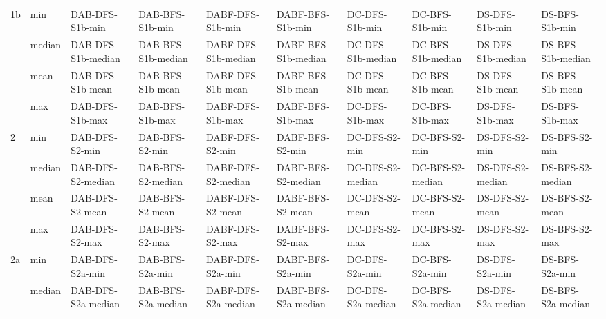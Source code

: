 \begin{table}
\begin{tabular}{|l|l|l|l|l|l|l|l|l|l|}
\hline
\multirow{4}{*}{1b} & min    & DAB-DFS-S1b-min    & DAB-BFS-S1b-min    & DABF-DFS-S1b-min    & DABF-BFS-S1b-min    & DC-DFS-S1b-min           & DC-BFS-S1b-min           & DS-DFS-S1b-min           & DS-BFS-S1b-min            \\
                    & median & DAB-DFS-S1b-median & DAB-BFS-S1b-median & DABF-DFS-S1b-median & DABF-BFS-S1b-median & DC-DFS-S1b-median        & DC-BFS-S1b-median        & DS-DFS-S1b-median        & DS-BFS-S1b-median         \\
                    & mean   & DAB-DFS-S1b-mean   & DAB-BFS-S1b-mean   & DABF-DFS-S1b-mean   & DABF-BFS-S1b-mean   & DC-DFS-S1b-mean          & DC-BFS-S1b-mean          & DS-DFS-S1b-mean          & DS-BFS-S1b-mean           \\
                    & max    & DAB-DFS-S1b-max    & DAB-BFS-S1b-max    & DABF-DFS-S1b-max    & DABF-BFS-S1b-max    & DC-DFS-S1b-max           & DC-BFS-S1b-max           & DS-DFS-S1b-max           & DS-BFS-S1b-max            \\
\hline
\multirow{4}{*}{2}  & min    & DAB-DFS-S2-min     & DAB-BFS-S2-min     & DABF-DFS-S2-min     & DABF-BFS-S2-min     & DC-DFS-S2-min            & DC-BFS-S2-min            & DS-DFS-S2-min            & DS-BFS-S2-min             \\
                    & median & DAB-DFS-S2-median  & DAB-BFS-S2-median  & DABF-DFS-S2-median  & DABF-BFS-S2-median  & DC-DFS-S2-median         & DC-BFS-S2-median         & DS-DFS-S2-median         & DS-BFS-S2-median          \\
                    & mean   & DAB-DFS-S2-mean    & DAB-BFS-S2-mean    & DABF-DFS-S2-mean    & DABF-BFS-S2-mean    & DC-DFS-S2-mean           & DC-BFS-S2-mean           & DS-DFS-S2-mean           & DS-BFS-S2-mean            \\
                    & max    & DAB-DFS-S2-max     & DAB-BFS-S2-max     & DABF-DFS-S2-max     & DABF-BFS-S2-max     & DC-DFS-S2-max            & DC-BFS-S2-max            & DS-DFS-S2-max            & DS-BFS-S2-max             \\
\hline
\multirow{4}{*}{2a} & min    & DAB-DFS-S2a-min    & DAB-BFS-S2a-min    & DABF-DFS-S2a-min    & DABF-BFS-S2a-min    & DC-DFS-S2a-min           & DC-BFS-S2a-min           & DS-DFS-S2a-min           & DS-BFS-S2a-min            \\
                    & median & DAB-DFS-S2a-median & DAB-BFS-S2a-median & DABF-DFS-S2a-median & DABF-BFS-S2a-median & DC-DFS-S2a-median        & DC-BFS-S2a-median        & DS-DFS-S2a-median        & DS-BFS-S2a-median         \\

\end{tabular}
\end{table}

